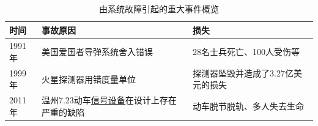 \documentclass[aspectratio=1610, 9pt, CJK]{beamer}
\begin{document}
\begin{frame}
			\begin{table}[htbp]
				\setlength{\abovecaptionskip}{-0.2cm}  %
				\setlength{\belowcaptionskip}{-0.4cm} %
				\fontsize{9pt}{\baselineskip}\selectfont
				\caption{由系统故障引起的重大事件概览}
				\label{tab:systemEvents_1.1}
				\centering
				\begin{tabular}{p{}p{}p{}}%
					\toprule
					\textbf{时间}&\textbf{事故原因}&\textbf{损失}\\
					\midrule
					1991年 & 美国爱国者导弹系统舍入错误 & 28名士兵死亡、100人受伤等\\
					1999年 & 火星探测器用错度量单位 & 探测器坠毁并造成了3.27亿美元的损失\\
					2011年 & 温州7.23动车\underline{信号设备}在设计上存在严重的缺陷 &动车脱节脱轨、多人失去生命\\
					\bottomrule
				\end{tabular}
			\end{table}
	\end{frame}
\end{document}
